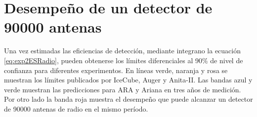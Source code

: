 



% 
% 	

	
\section{Desempe\~no de un detector de 90000 antenas}
	
	Una vez estimadas las eficiencias de detecci\'on, mediante integrano la ecuaci\'on \ref{eq:exp2ESRadio}, pueden obtenerse los l\'imites diferenciales al 90$\%$ de nivel de confianza para diferentes experimentos.
	En l\'ineas verde, naranja y rosa se muestran los l\'imites publicados por IceCube, Auger y Anita-II. 
	Las bandas azul y verde muestran las predicciones para ARA y Ariana en tres a\~nos de medici\'on. Por otro lado la banda roja muestra el desempe\~no que puede alcanzar un detector de 90000 antenas de radio en el mismo per\'iodo.
	
